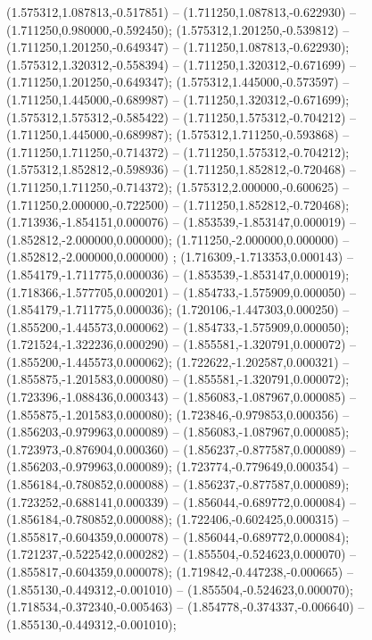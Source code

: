  (1.575312,1.087813,-0.517851) -- (1.711250,1.087813,-0.622930) -- (1.711250,0.980000,-0.592450);
 (1.575312,1.201250,-0.539812) -- (1.711250,1.201250,-0.649347) -- (1.711250,1.087813,-0.622930);
 (1.575312,1.320312,-0.558394) -- (1.711250,1.320312,-0.671699) -- (1.711250,1.201250,-0.649347);
 (1.575312,1.445000,-0.573597) -- (1.711250,1.445000,-0.689987) -- (1.711250,1.320312,-0.671699);
 (1.575312,1.575312,-0.585422) -- (1.711250,1.575312,-0.704212) -- (1.711250,1.445000,-0.689987);
 (1.575312,1.711250,-0.593868) -- (1.711250,1.711250,-0.714372) -- (1.711250,1.575312,-0.704212);
 (1.575312,1.852812,-0.598936) -- (1.711250,1.852812,-0.720468) -- (1.711250,1.711250,-0.714372);
 (1.575312,2.000000,-0.600625) -- (1.711250,2.000000,-0.722500) -- (1.711250,1.852812,-0.720468);
 (1.713936,-1.854151,0.000076) -- (1.853539,-1.853147,0.000019) -- (1.852812,-2.000000,0.000000);
 (1.711250,-2.000000,0.000000) -- (1.852812,-2.000000,0.000000) ;
 (1.716309,-1.713353,0.000143) -- (1.854179,-1.711775,0.000036) -- (1.853539,-1.853147,0.000019);
 (1.718366,-1.577705,0.000201) -- (1.854733,-1.575909,0.000050) -- (1.854179,-1.711775,0.000036);
 (1.720106,-1.447303,0.000250) -- (1.855200,-1.445573,0.000062) -- (1.854733,-1.575909,0.000050);
 (1.721524,-1.322236,0.000290) -- (1.855581,-1.320791,0.000072) -- (1.855200,-1.445573,0.000062);
 (1.722622,-1.202587,0.000321) -- (1.855875,-1.201583,0.000080) -- (1.855581,-1.320791,0.000072);
 (1.723396,-1.088436,0.000343) -- (1.856083,-1.087967,0.000085) -- (1.855875,-1.201583,0.000080);
 (1.723846,-0.979853,0.000356) -- (1.856203,-0.979963,0.000089) -- (1.856083,-1.087967,0.000085);
 (1.723973,-0.876904,0.000360) -- (1.856237,-0.877587,0.000089) -- (1.856203,-0.979963,0.000089);
 (1.723774,-0.779649,0.000354) -- (1.856184,-0.780852,0.000088) -- (1.856237,-0.877587,0.000089);
 (1.723252,-0.688141,0.000339) -- (1.856044,-0.689772,0.000084) -- (1.856184,-0.780852,0.000088);
 (1.722406,-0.602425,0.000315) -- (1.855817,-0.604359,0.000078) -- (1.856044,-0.689772,0.000084);
 (1.721237,-0.522542,0.000282) -- (1.855504,-0.524623,0.000070) -- (1.855817,-0.604359,0.000078);
 (1.719842,-0.447238,-0.000665) -- (1.855130,-0.449312,-0.001010) -- (1.855504,-0.524623,0.000070);
 (1.718534,-0.372340,-0.005463) -- (1.854778,-0.374337,-0.006640) -- (1.855130,-0.449312,-0.001010);
